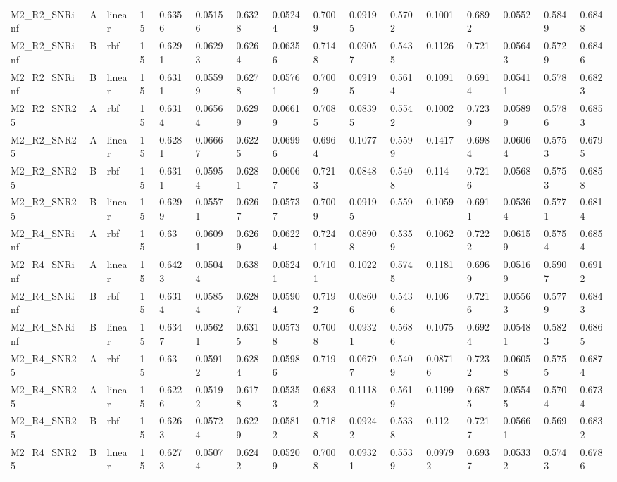 \begin{tabular}{llllllllllllllll}
M2\_R2\_SNRinf & A & linear & 15 & 0.6356 & 0.05156 & 0.6328 & 0.05244 & 0.7009 & 0.09195 & 0.5702 & 0.1001 & 0.6892 & 0.0552 & 0.5849 & 0.6848 \\
M2\_R2\_SNRinf & B & rbf & 15 & 0.6291 & 0.06293 & 0.6264 & 0.06356 & 0.7148 & 0.09057 & 0.5435 & 0.1126 & 0.721 & 0.05643 & 0.5729 & 0.6846 \\
M2\_R2\_SNRinf & B & linear & 15 & 0.6311 & 0.05599 & 0.6278 & 0.05761 & 0.7009 & 0.09195 & 0.5614 & 0.1091 & 0.6914 & 0.05411 & 0.578 & 0.6823 \\
M2\_R2\_SNR25 & A & rbf & 15 & 0.6314 & 0.06564 & 0.6299 & 0.06619 & 0.7085 & 0.08395 & 0.5542 & 0.1002 & 0.7239 & 0.05899 & 0.5786 & 0.6853 \\
M2\_R2\_SNR25 & A & linear & 15 & 0.6281 & 0.06667 & 0.6225 & 0.06996 & 0.6964 & 0.1077 & 0.5599 & 0.1417 & 0.6984 & 0.06064 & 0.5753 & 0.6795 \\
M2\_R2\_SNR25 & B & rbf & 15 & 0.6311 & 0.05954 & 0.6281 & 0.06067 & 0.7213 & 0.0848 & 0.5408 & 0.114 & 0.7216 & 0.0568 & 0.5753 & 0.6858 \\
M2\_R2\_SNR25 & B & linear & 15 & 0.6299 & 0.05571 & 0.6267 & 0.05737 & 0.7009 & 0.09195 & 0.559 & 0.1059 & 0.6911 & 0.05364 & 0.5771 & 0.6814 \\
M2\_R4\_SNRinf & A & rbf & 15 & 0.63 & 0.06091 & 0.6269 & 0.06224 & 0.7241 & 0.08908 & 0.5359 & 0.1062 & 0.7222 & 0.06159 & 0.5754 & 0.6854 \\
M2\_R4\_SNRinf & A & linear & 15 & 0.6423 & 0.05044 & 0.638 & 0.05241 & 0.7101 & 0.1022 & 0.5745 & 0.1181 & 0.6969 & 0.05169 & 0.5907 & 0.6912 \\
M2\_R4\_SNRinf & B & rbf & 15 & 0.6314 & 0.05854 & 0.6287 & 0.05904 & 0.7192 & 0.08606 & 0.5436 & 0.106 & 0.7216 & 0.05563 & 0.5779 & 0.6843 \\
M2\_R4\_SNRinf & B & linear & 15 & 0.6347 & 0.05621 & 0.6315 & 0.05738 & 0.7008 & 0.09321 & 0.5686 & 0.1075 & 0.6924 & 0.05481 & 0.5823 & 0.6865 \\
M2\_R4\_SNR25 & A & rbf & 15 & 0.63 & 0.05912 & 0.6284 & 0.05986 & 0.719 & 0.06797 & 0.5409 & 0.08716 & 0.7232 & 0.06058 & 0.5755 & 0.6874 \\
M2\_R4\_SNR25 & A & linear & 15 & 0.6226 & 0.05192 & 0.6178 & 0.05353 & 0.6832 & 0.1118 & 0.5619 & 0.1199 & 0.6875 & 0.05545 & 0.5704 & 0.6734 \\
M2\_R4\_SNR25 & B & rbf & 15 & 0.6263 & 0.05724 & 0.6229 & 0.05812 & 0.7188 & 0.09242 & 0.5338 & 0.112 & 0.7217 & 0.05661 & 0.569 & 0.6832 \\
M2\_R4\_SNR25 & B & linear & 15 & 0.6273 & 0.05074 & 0.6242 & 0.05209 & 0.7008 & 0.09321 & 0.5539 & 0.09792 & 0.6937 & 0.05332 & 0.5743 & 0.6786 \\

\end{tabular}
